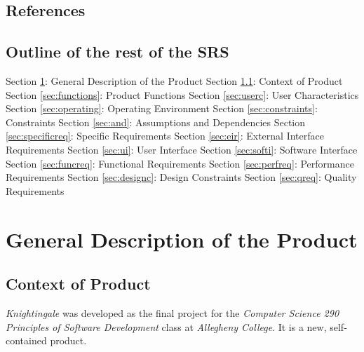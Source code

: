 \documentclass[a4paper, 12pt]{article}
\begin{document}
\subsection{References} \label{sec:ref}
\begin{adjustwidth}{2em}{0pt}

\end{adjustwidth}

\subsection{Outline of the rest of the SRS} \label{sec:outline}
\begin{adjustwidth}{2em}{0pt}
Section \ref{sec:general}: General Description of the Product \newline
Section \ref{sec:context}: Context of Product \newline
Section \ref{sec:functions}: Product Functions \newline
Section \ref{sec:userc}: User Characteristics \newline
Section \ref{sec:operating}: Operating Environment \newline
Section \ref{sec:constraints}: Constraints \newline
Section \ref{sec:and}: Assumptions and Dependencies \newline
Section \ref{sec:specificreq}: Specific Requirements \newline
Section \ref{sec:eir}: External Interface Requirements \newline
Section \ref{sec:ui}: User Interface \newline
Section \ref{sec:softi}: Software Interface \newline
Section \ref{sec:funcreq}: Functional Requirements \newline
Section \ref{sec:perfreq}: Performance Requirements \newline
Section \ref{sec:designc}: Design Constraints \newline
Section \ref{sec:qreq}: Quality Requirements \newline
\end{adjustwidth}

\section{General Description of the Product} \label{sec:general}
\subsection{Context of Product} \label{sec:context}
\begin{adjustwidth}{2em}{0pt}
\textit{Knightingale} was developed as the final project for the \textit{Computer Science 290 Principles of Software Development} class at \textit{Allegheny College}. It is a new, self-contained product. 
\end{adjustwidth}
 
\end{document}
